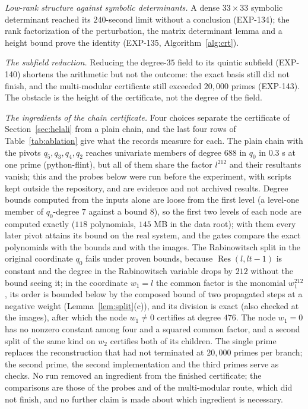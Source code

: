 \documentclass[11pt]{article}
\theoremstyle{remark}
\begin{document}
\emph{Low-rank structure against symbolic determinants.} A dense $33\times33$ symbolic determinant reached its $240$-second limit without a conclusion (EXP-134); the rank factorization of the perturbation, the
matrix determinant lemma and a height bound prove the identity (EXP-135, Algorithm~\ref{alg:crt}).

\emph{The subfield reduction.} Reducing the degree-$35$ field to its quintic subfield (EXP-140) shortens the arithmetic but not the outcome: the exact basis still did not finish, and the multi-modular certificate still
exceeded $20{,}000$ primes (EXP-143). The obstacle is the height of the certificate, not the degree of the field.

\emph{The ingredients of the chain certificate.} Four choices separate the certificate of Section~\ref{sec:helali} from a plain chain, and the last four rows of Table~\ref{tab:ablation} give what the records measure for each. The plain chain with the pivots $q_5,q_3,q_4,q_2$ reaches univariate members of degree $688$ in $q_0$ in $0.3$ s at one prime (python-flint),
but all of them share the factor $l^{212}$ and their resultants vanish; this and the probes below were run before the experiment, with scripts kept outside the repository, and are evidence and not archived results. Degree bounds computed from the inputs alone are loose from the first level (a level-one member of $q_0$-degree $7$ against a bound $8$), so the first two levels of each node are
computed exactly ($118$ polynomials, $145$ MB in the data root); with them every later pivot attains its bound on the real system, and the gates compare the exact polynomials with the bounds and with the images. The Rabinowitsch split in the original coordinate $q_0$ fails under proven bounds, because $\operatorname{Res}(l,lt-1)$ is constant and the degree in the Rabinowitsch variable
drops by $212$ without the bound seeing it; in the coordinate $w_1=l$ the common factor is the monomial $w_1^{212}$, its order is bounded below by the composed bound of two propagated steps at a negative weight (Lemma~\ref{lem:split}(c)), and its division is exact (also checked at the images), after which the node $w_1\ne0$ certifies at degree $476$. The node $w_1=0$ has no nonzero constant among four and a squared common factor, and a second split of the same kind on $w_2$ certifies both of its children.
The single prime replaces the reconstruction that had not terminated at $20{,}000$ primes per branch; the second prime, the second implementation and the third primes serve as checks. No run removed an ingredient from the finished certificate; the comparisons are those of the probes and of the multi-modular route, which did not finish, and no further claim is made about which ingredient is necessary.
\end{document}
